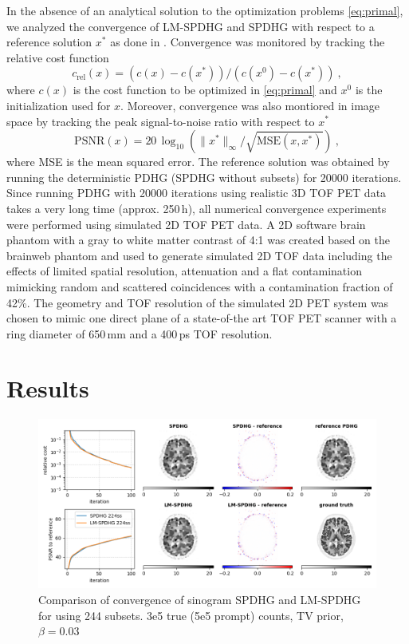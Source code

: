 In the absence of an analytical solution to the optimization problems \eqref{eq:primal}, 
we analyzed the convergence of LM-SPDHG and SPDHG with respect to a 
reference solution $x^*$ as done in \cite{Ehrhardt2019}.
Convergence was monitored by tracking the relative cost function
\begin{equation}
c_\text{rel}(x) = (c(x) - c(x^*)) / (c(x^0) - c(x^*)) \ ,
\end{equation}
where $c(x)$ is the cost function to be optimized in \eqref{eq:primal} and $x^0$ is the initialization
used for $x$.
Moreover, convergence was also montiored in image space by tracking the peak signal-to-noise ratio
with respect to $x^*$
\begin{equation}
\text{PSNR}(x) = 20\,\log_{10} \left( \|x^*\|_\infty/\sqrt{\text{MSE}(x,x^*)} \right) \ ,
\end{equation}
where MSE is the mean squared error.
The reference solution was obtained by running the deterministic PDHG (SPDHG without subsets)
for 20000 iterations.
Since running PDHG with 20000 iterations using realistic 3D TOF PET data takes a very long 
time (approx. 250\,h), all numerical convergence experiments were performed using simulated 2D TOF PET data.
A 2D software brain phantom with a gray to white matter contrast of 4:1 was created
based on the brainweb phantom \cite{Collins1998} and used to generate simulated 2D TOF data 
including the effects of limited spatial resolution, attenuation and a flat contamination mimicking 
random and scattered coincidences with a contamination fraction of 42\%.
The geometry and TOF resolution of the simulated 2D PET system was chosen to 
mimic one direct plane of a state-of-the art TOF PET scanner with a ring diameter of 650\,mm
and a 400\,ps TOF resolution.


\section{Results}

\begin{figure}
\centering
\includegraphics[width=1.0\columnwidth]{./figure3a.png}
\caption{Comparison of convergence of sinogram SPDHG and LM-SPDHG
         for using 244 subsets. 3e5 true (5e5 prompt) counts, TV prior, $\beta = 0.03$}
\label{fig:lm-spdhg-var}
\end{figure}


